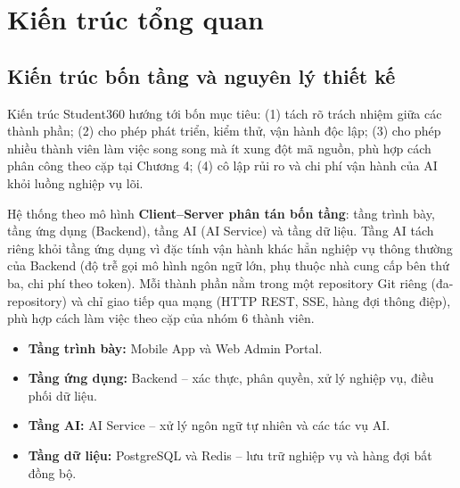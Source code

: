 \section{Kiến trúc tổng quan}

\subsection{Kiến trúc bốn tầng và nguyên lý thiết kế}
Kiến trúc Student360 hướng tới bốn mục tiêu: (1) tách rõ trách nhiệm giữa các thành phần; (2) cho phép phát triển, kiểm thử, vận hành độc lập; (3) cho phép nhiều thành viên làm việc song song mà ít xung đột mã nguồn, phù hợp cách phân công theo cặp tại Chương 4; (4) cô lập rủi ro và chi phí vận hành của AI khỏi luồng nghiệp vụ lõi.

Hệ thống theo mô hình \textbf{Client--Server phân tán bốn tầng}: tầng trình bày, tầng ứng dụng (Backend), tầng AI (AI Service) và tầng dữ liệu. Tầng AI tách riêng khỏi tầng ứng dụng vì đặc tính vận hành khác hẳn nghiệp vụ thông thường của Backend (độ trễ gọi mô hình ngôn ngữ lớn, phụ thuộc nhà cung cấp bên thứ ba, chi phí theo token). Mỗi thành phần nằm trong một repository Git riêng (đa-repository) và chỉ giao tiếp qua mạng (HTTP REST, SSE, hàng đợi thông điệp), phù hợp cách làm việc theo cặp của nhóm 6 thành viên.

\begin{itemize}
    \item \textbf{Tầng trình bày:} Mobile App và Web Admin Portal.
    \item \textbf{Tầng ứng dụng:} Backend -- xác thực, phân quyền, xử lý nghiệp vụ, điều phối dữ liệu.
    \item \textbf{Tầng AI:} AI Service -- xử lý ngôn ngữ tự nhiên và các tác vụ AI.
    \item \textbf{Tầng dữ liệu:} PostgreSQL và Redis -- lưu trữ nghiệp vụ và hàng đợi bất đồng bộ.
\end{itemize}

